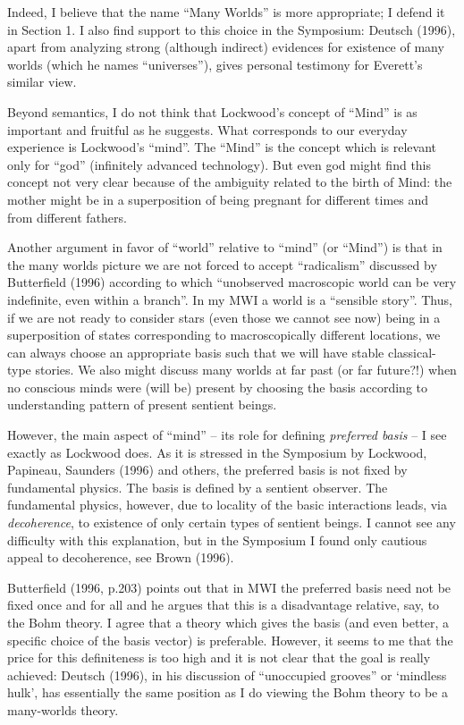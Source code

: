  Indeed, I believe that the name ``Many Worlds'' is more
appropriate; I defend it in Section 1. I also find support to this
choice in the Symposium:
Deutsch (1996), apart from analyzing strong (although indirect)
evidences for existence of many worlds (which he names ``universes''),
gives personal testimony for Everett's similar view.

Beyond semantics, I do not think that Lockwood's concept of ``Mind''
is as important and fruitful as he suggests. What corresponds to our
everyday experience is Lockwood's ``mind''. The ``Mind'' is the
concept which is relevant only for ``god'' (infinitely advanced
technology). But even god might find this concept not very clear
because of the ambiguity related to the birth of Mind: the mother
might be in a superposition of being pregnant for different times and
from different fathers.
 
Another argument in favor of ``world'' relative to ``mind'' (or
``Mind'') is that in the many worlds picture we are not forced to
accept ``radicalism'' discussed by Butterfield (1996) according to
which ``unobserved macroscopic world can be very indefinite, even
within a branch''. In my MWI a world is a ``sensible story''. Thus, if
we are not ready to consider stars (even those we cannot see now)
being in a superposition of states corresponding to macroscopically
different locations, we can always choose an appropriate basis such that
we will have stable classical-type stories. We also might discuss many
worlds at far past (or far future?!) when no conscious minds were
(will be) present by choosing the basis according to understanding
pattern of present sentient beings.

However, the main aspect of ``mind'' -- its role for defining {\it
  preferred basis} -- I see exactly as Lockwood does.  As it is
stressed in the Symposium by Lockwood, Papineau, Saunders (1996) and
others, the preferred basis is not fixed by fundamental physics. The
basis is defined by a sentient observer. The fundamental physics,
however, due to locality of the basic interactions leads, via {\it
  decoherence}, to existence of only certain types of sentient beings.
I cannot see any difficulty with this explanation, but in the
Symposium I found only cautious appeal to decoherence, see Brown
(1996).

Butterfield (1996, p.203) points out that in MWI the preferred basis
need not be fixed once and for all and he argues that this is a
disadvantage relative, say, to the Bohm theory. I agree that a theory
which gives the basis (and even better, a specific choice of the basis
vector) is preferable. However, it seems to me that the price for this
definiteness is too high and it is not clear that the goal is really
achieved: Deutsch (1996), in his discussion of ``unoccupied grooves''
or `mindless hulk', has essentially the same position as I do viewing
the Bohm theory to be a many-worlds theory.


